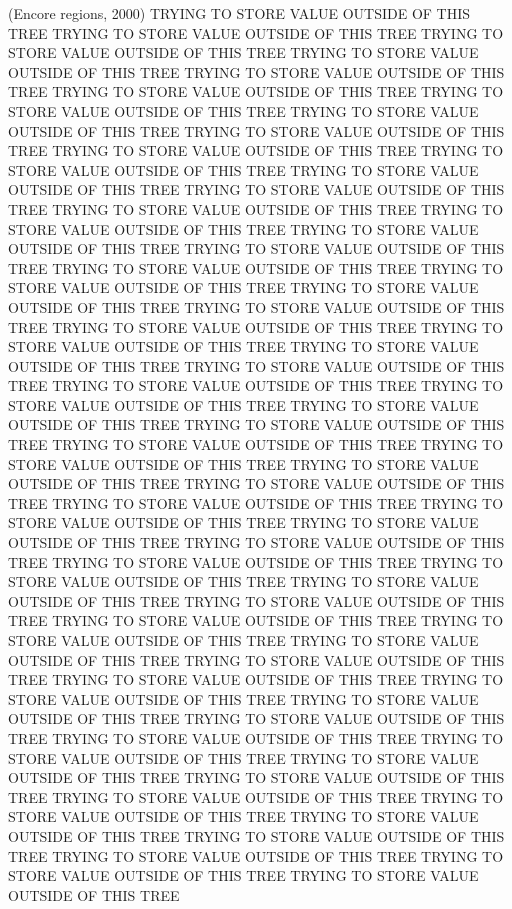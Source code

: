 (Encore regions, 2000)
TRYING TO STORE VALUE OUTSIDE OF THIS TREE
TRYING TO STORE VALUE OUTSIDE OF THIS TREE
TRYING TO STORE VALUE OUTSIDE OF THIS TREE
TRYING TO STORE VALUE OUTSIDE OF THIS TREE
TRYING TO STORE VALUE OUTSIDE OF THIS TREE
TRYING TO STORE VALUE OUTSIDE OF THIS TREE
TRYING TO STORE VALUE OUTSIDE OF THIS TREE
TRYING TO STORE VALUE OUTSIDE OF THIS TREE
TRYING TO STORE VALUE OUTSIDE OF THIS TREE
TRYING TO STORE VALUE OUTSIDE OF THIS TREE
TRYING TO STORE VALUE OUTSIDE OF THIS TREE
TRYING TO STORE VALUE OUTSIDE OF THIS TREE
TRYING TO STORE VALUE OUTSIDE OF THIS TREE
TRYING TO STORE VALUE OUTSIDE OF THIS TREE
TRYING TO STORE VALUE OUTSIDE OF THIS TREE
TRYING TO STORE VALUE OUTSIDE OF THIS TREE
TRYING TO STORE VALUE OUTSIDE OF THIS TREE
TRYING TO STORE VALUE OUTSIDE OF THIS TREE
TRYING TO STORE VALUE OUTSIDE OF THIS TREE
TRYING TO STORE VALUE OUTSIDE OF THIS TREE
TRYING TO STORE VALUE OUTSIDE OF THIS TREE
TRYING TO STORE VALUE OUTSIDE OF THIS TREE
TRYING TO STORE VALUE OUTSIDE OF THIS TREE
TRYING TO STORE VALUE OUTSIDE OF THIS TREE
TRYING TO STORE VALUE OUTSIDE OF THIS TREE
TRYING TO STORE VALUE OUTSIDE OF THIS TREE
TRYING TO STORE VALUE OUTSIDE OF THIS TREE
TRYING TO STORE VALUE OUTSIDE OF THIS TREE
TRYING TO STORE VALUE OUTSIDE OF THIS TREE
TRYING TO STORE VALUE OUTSIDE OF THIS TREE
TRYING TO STORE VALUE OUTSIDE OF THIS TREE
TRYING TO STORE VALUE OUTSIDE OF THIS TREE
TRYING TO STORE VALUE OUTSIDE OF THIS TREE
TRYING TO STORE VALUE OUTSIDE OF THIS TREE
TRYING TO STORE VALUE OUTSIDE OF THIS TREE
TRYING TO STORE VALUE OUTSIDE OF THIS TREE
TRYING TO STORE VALUE OUTSIDE OF THIS TREE
TRYING TO STORE VALUE OUTSIDE OF THIS TREE
TRYING TO STORE VALUE OUTSIDE OF THIS TREE
TRYING TO STORE VALUE OUTSIDE OF THIS TREE
TRYING TO STORE VALUE OUTSIDE OF THIS TREE
TRYING TO STORE VALUE OUTSIDE OF THIS TREE
TRYING TO STORE VALUE OUTSIDE OF THIS TREE
TRYING TO STORE VALUE OUTSIDE OF THIS TREE
TRYING TO STORE VALUE OUTSIDE OF THIS TREE
TRYING TO STORE VALUE OUTSIDE OF THIS TREE
TRYING TO STORE VALUE OUTSIDE OF THIS TREE
TRYING TO STORE VALUE OUTSIDE OF THIS TREE
TRYING TO STORE VALUE OUTSIDE OF THIS TREE
TRYING TO STORE VALUE OUTSIDE OF THIS TREE
TRYING TO STORE VALUE OUTSIDE OF THIS TREE
TRYING TO STORE VALUE OUTSIDE OF THIS TREE
TRYING TO STORE VALUE OUTSIDE OF THIS TREE
TRYING TO STORE VALUE OUTSIDE OF THIS TREE
TRYING TO STORE VALUE OUTSIDE OF THIS TREE
TRYING TO STORE VALUE OUTSIDE OF THIS TREE
TRYING TO STORE VALUE OUTSIDE OF THIS TREE
TRYING TO STORE VALUE OUTSIDE OF THIS TREE
TRYING TO STORE VALUE OUTSIDE OF THIS TREE
TRYING TO STORE VALUE OUTSIDE OF THIS TREE
